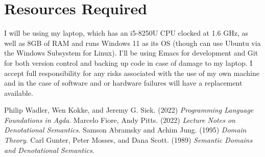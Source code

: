 \documentclass{article}
\begin{document}
\section{Resources Required}
I will be using my laptop, which has an i5-8250U CPU clocked at 1.6 GHz, as well as 8GB of RAM and runs Windows 11 as its OS (though can use Ubuntu via the Windows Subsystem for Linux). I'll be using Emacs for development and Git for both version control and backing up code in case of damage to my laptop. I accept full responsibility for any risks associated with the use of my own machine and in the case of software and or hardware failures will have a replacement available. 
\begin{thebibliography}{9}
Philip Wadler, Wen Kokke, and Jeremy G. Siek. (2022) \emph{Programming Language Foundations in Agda}.
Marcelo Fiore, Andy Pitts. (2022) \emph{Lecture Notes on Denotational Semantics}.
Samson Abramsky and Achim Jung. (1995) \emph{Domain Theory}.
Carl Gunter, Peter Mosses, and Dana Scott. (1989) \emph{Semantic Domains and Denotational Semantics}. 
\end{thebibliography}
\end{document}

